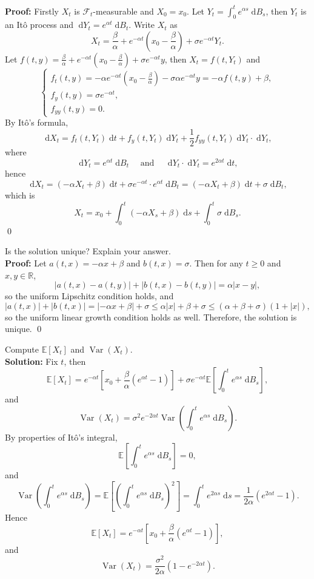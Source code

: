 \documentclass{MFM-hw} %
\newcommand{\Var}{\operatorname{Var}}
\newcommand{\filtration}{\mathcal{F}_t}
\newcommand{\dd}{\;\mathrm{d}}
\newcommand{\EE}{\mathbb{E}}
\newcommand{\Ito}{It\^{o}}
\newcommand{\realset}{\mathbb{R}}
\begin{document}
\textbf{Proof: } Firstly $X_t$ is $\filtration$-measurable and $X_0 = x_0$. Let $Y_t = \int_0^t e^{\alpha s} \dd B_s$, then $Y_t$ is an {\Ito} process and $\dd Y_t = e^{\alpha t} \dd B_t$. Write $X_t$ as
\[
    X_t = \frac{\beta}{\alpha} + e^{-\alpha t}(x_0 - \frac{\beta}{\alpha}) + \sigma e^{-\alpha t} Y_t.
\]
Let $f(t, y) = \frac{\beta}{\alpha} + e^{-\alpha t}(x_0 - \frac{\beta}{\alpha}) + \sigma e^{-\alpha t} y$, then $X_t = f(t, Y_t)$ and
\[
\begin{cases}
    f_t(t,y) = -\alpha e^{-\alpha t}(x_0 - \frac{\beta}{\alpha}) - \sigma \alpha e^{-\alpha t} y = -\alpha f(t,y) + \beta,\\
    f_y(t,y) = \sigma e^{-\alpha t}, \\
    f_{yy} (t, y) = 0.
\end{cases}
\]
By \Ito's formula,
\[
    \dd X_t = f_t(t,Y_t) \dd t + f_y(t,Y_t) \dd Y_t + \frac{1}{2} f_{yy}(t,Y_t) \dd Y_t \cdot \dd Y_t,
\]
where
\[
    \dd Y_t = e^{\alpha t} \dd B_t \quad \text{  and  }\quad \dd Y_t \cdot \dd Y_t = e^{2\alpha t} \dd t,
\]
hence
\[
    \dd X_t = (-\alpha X_t + \beta) \dd t + \sigma e^{-\alpha t} \cdot e^{\alpha t} \dd B_t = (-\alpha X_t + \beta) \dd t + \sigma \dd B_t,
\]
which is
\[
    X_t = x_0 + \int_0^{t} (-\alpha X_s + \beta) \dd s + \int_0^{t} \sigma \dd B_s.
\]\qed

\HWsubproblem
Is the solution unique? Explain your answer.\\

\textbf{Proof: }Let $a(t,x) = -\alpha x + \beta$ and $b(t,x) = \sigma$. Then for any $t \ge 0$ and $x, y \in \realset$,
\[
    |a(t,x) - a(t,y)| + |b(t,x) - b(t,y)| = \alpha |x-y|,
\]
so the uniform Lipschitz condition holds, and
\[
    |a(t,x)| + |b(t,x)| = |-\alpha x + \beta| + \sigma \le \alpha |x| + \beta + \sigma \le (\alpha + \beta + \sigma) (1 + |x|),
\]
so the uniform linear growth condition holds as well. Therefore, the solution is unique. \qed

\HWsubproblem
Compute $\EE[X_t]$ and $\Var(X_t)$.\\

\textbf{Solution: }Fix $t$, then
\[
    \EE[X_t] = e^{-\alpha t} \left[ x_0 + \frac{\beta}{\alpha}(e^{\alpha t}-1) \right] + \sigma e^{-\alpha t} \EE\left[\int_0^t e^{\alpha s} \dd B_s\right],
\]
and
\[
    \Var(X_t) = \sigma^2 e^{-2\alpha t} \Var\left(\int_0^t e^{\alpha s} \dd B_s\right).
\]
By properties of \Ito's integral,
\[
    \EE\left[\int_0^t e^{\alpha s} \dd B_s\right] = 0,
\]
and
\[
    \Var\left(\int_0^t e^{\alpha s} \dd B_s\right) = \EE\left[(\int_0^t e^{\alpha s} \dd B_s)^2\right] = \int_0^t e^{2\alpha s} \dd s = \frac{1}{2\alpha} (e^{2\alpha t} - 1). 
\]
Hence
\[
    \EE[X_t] = e^{-\alpha t} \left[ x_0 + \frac{\beta}{\alpha}(e^{\alpha t}-1) \right],
\]
and
\[
    \Var(X_t) = \frac{\sigma^2}{2\alpha} (1 - e^{-2\alpha t}).
\]
\end{document}

